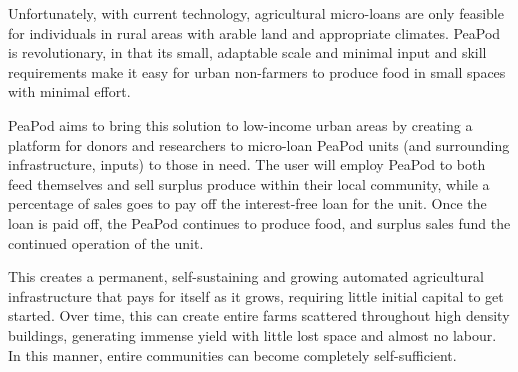 \documentclass{report}
\begin{document}
Unfortunately, with current technology, agricultural micro-loans are only feasible for individuals in rural areas with arable land and appropriate climates. PeaPod is revolutionary, in that its small, adaptable scale and minimal input and skill requirements make it easy for urban non-farmers to produce food in small spaces with minimal effort.

PeaPod aims to bring this solution to low-income urban areas by creating a platform for donors and researchers to micro-loan PeaPod units (and surrounding infrastructure, inputs) to those in need. The user will employ PeaPod to both feed themselves and sell surplus produce within their local community, while a percentage of sales goes to pay off the interest-free loan for the unit. Once the loan is paid off, the PeaPod continues to produce food, and surplus sales fund the continued operation of the unit. 

This creates a permanent, self-sustaining and growing automated agricultural infrastructure that pays for itself as it grows, requiring little initial capital to get started. Over time, this can create entire farms scattered throughout high density buildings, generating immense yield with little lost space and almost no labour. In this manner, entire communities can become completely self-sufficient.



% 
% 
\end{document}
